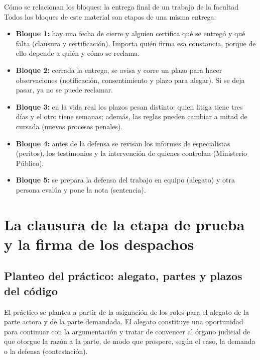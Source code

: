 \documentclass[12pt,oneside]{book}
\begin{document}
\begin{example}{Cómo se relacionan los bloques: la entrega final de un trabajo de la facultad}
Todos los bloques de este material son etapas de una misma entrega:
\begin{itemize}
    \item \textbf{Bloque 1:} hay una fecha de cierre y alguien certifica qué se entregó y qué falta (clausura y certificación). Importa quién firma esa constancia, porque de ello depende a quién y cómo se reclama.
    \item \textbf{Bloque 2:} cerrada la entrega, se avisa y corre un plazo para hacer observaciones (notificación, consentimiento y plazo para alegar). Si se deja pasar, ya no se puede reclamar.
    \item \textbf{Bloque 3:} en la vida real los plazos pesan distinto: quien litiga tiene tres días y el otro tiene semanas; además, las reglas pueden cambiar a mitad de cursada (nuevos procesos penales).
    \item \textbf{Bloque 4:} antes de la defensa se revisan los informes de especialistas (peritos), los testimonios y la intervención de quienes controlan (Ministerio Público).
    \item \textbf{Bloque 5:} se prepara la defensa del trabajo en equipo (alegato) y otra persona evalúa y pone la nota (sentencia).
\end{itemize}
\end{example}

\chapter[Clausura y firma de despachos]{La clausura de la etapa de prueba y la firma de los despachos}

\section{Planteo del práctico: alegato, partes y plazos del código}

El práctico se plantea a partir de la asignación de los roles para el alegato de la parte actora y de la parte demandada. El alegato constituye una oportunidad para continuar con la argumentación y tratar de convencer al órgano judicial de que otorgue la razón a la parte, de modo que prospere, según el caso, la demanda o la defensa (contestación).
\end{document}
